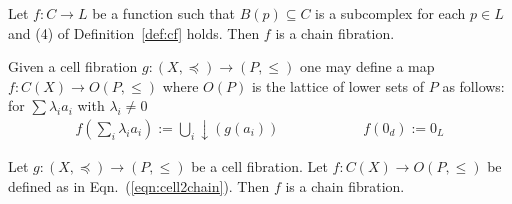 \begin{cor}\label{cor:cfEquiv}
Let $f:C\to L$ be a function such that $B(p)\subseteq C$ is a subcomplex for each $p\in L$ and (4) of Definition~\ref{def:cf} holds.  Then $f$ is a chain fibration.
\end{cor}


Given a cell fibration $g:(X,\preceq)\to (P,\leq)$ one may define a map $f:C(X)\to O(P,\leq)$ where $O(P)$ is the lattice of lower sets of $P$ as follows: for $\sum \lambda_i a_i$ with $\lambda_i\neq 0$
\begin{align} \label{eqn:cell2chain}
f(\sum_i \lambda_i a_i):= \bigcup_i \downarrow (g(a_i))\quad\quad\quad\quad\quad\quad
f(0_d):= 0_L
\end{align}

\begin{prop}
Let $g:(X,\preceq)\to (P,\leq)$ be a cell fibration.  Let $f:C(X)\to O(P,\leq)$ be defined as in Eqn.~(\ref{eqn:cell2chain}).  Then $f$ is a chain fibration.
\end{prop}
